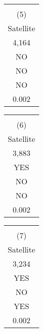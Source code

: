 \begin{tabular}{c} \hline \hline \\[-2mm] (5) \\ Satellite \\ \hline     4,164 \\ NO \\ NO \\ NO \\     0.002 \\ \hline \end{tabular}%
\begin{tabular}{c} \hline \hline \\[-2mm] (6) \\ Satellite \\ \hline     3,883 \\ YES \\ NO \\ NO \\     0.002 \\ \hline \end{tabular}%
\begin{tabular}{c} \hline \hline \\[-2mm] (7) \\ Satellite \\ \hline     3,234 \\ YES \\ NO \\ YES \\     0.002 \\ \hline \end{tabular}
